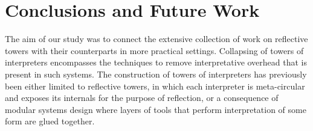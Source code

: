 \documentclass[a4paper,12pt,twoside,openright]{report}
\theoremstyle{definition}
\begin{document}
\section{Conclusions and Future Work}\label{sec:conclusion}
The aim of our study was to connect the extensive collection of work on reflective towers with their counterparts in more practical settings. Collapsing of towers of interpreters encompasses the techniques to remove interpretative overhead that is present in such systems. The construction of towers of interpreters has previously been either limited to reflective towers, in which each interpreter is meta-circular and exposes its internals for the purpose of reflection, or a consequence of modular systems design where layers of tools that perform interpretation of some form are glued together.
\end{document}

